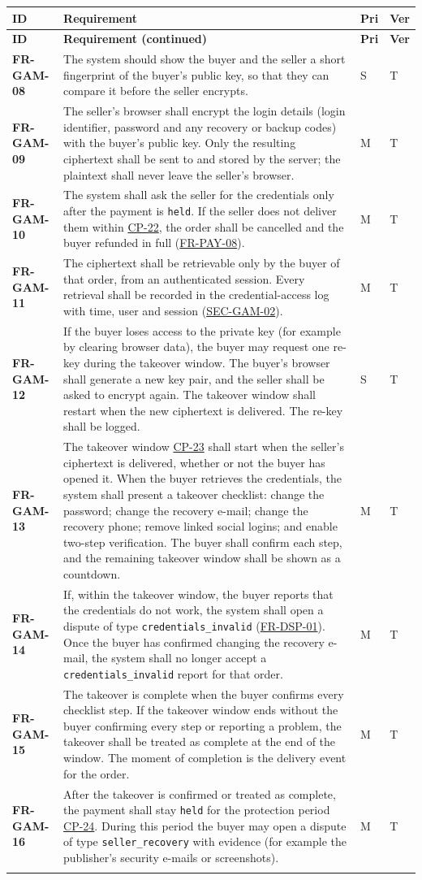 \documentclass[11pt,a4paper]{report}
\makeatletter
\newenvironment{reqs}{%
  \small
  \begin{longtable}{@{}>{\raggedright\arraybackslash}p{2.35cm}
                       >{\raggedright\arraybackslash}p{10.3cm}
                       >{\centering\arraybackslash}p{0.7cm}
                       >{\centering\arraybackslash}p{0.7cm}@{}}
  \toprule
  \textbf{ID} & \textbf{Requirement} & \textbf{Pri} & \textbf{Ver} \\
  \midrule
  \endfirsthead
  \toprule
  \textbf{ID} & \textbf{Requirement (continued)} & \textbf{Pri} & \textbf{Ver} \\
  \midrule
  \endhead
  \bottomrule
  \endfoot
}{\end{longtable}}
\newcommand{\req}[5]{\leavevmode\textbf{#1}\hypertarget{#1}{} & #5 & #2 & #3 \\ \addlinespace[2pt]}
\newcommand{\rr}[1]{\hyperlink{#1}{#1}}
\newcommand{\cp}[1]{\hyperlink{#1}{#1}}
\makeatother
\begin{document}
\begin{reqs}
\req{FR-GAM-08}{S}{T}{new}{The system should show the buyer and the seller a short fingerprint of the buyer's public key, so that they can compare it before the seller encrypts.}
\req{FR-GAM-09}{M}{T}{FR-97}{The seller's browser shall encrypt the login details (login identifier, password and any recovery or backup codes) with the buyer's public key. Only the resulting ciphertext shall be sent to and stored by the server; the plaintext shall never leave the seller's browser.}
\req{FR-GAM-10}{M}{T}{FR-98}{The system shall ask the seller for the credentials only after the payment is \texttt{held}. If the seller does not deliver them within \cp{CP-22}, the order shall be cancelled and the buyer refunded in full (\rr{FR-PAY-08}).}
\req{FR-GAM-11}{M}{T}{FR-98}{The ciphertext shall be retrievable only by the buyer of that order, from an authenticated session. Every retrieval shall be recorded in the credential-access log with time, user and session (\rr{SEC-GAM-02}).}
\req{FR-GAM-12}{S}{T}{new}{If the buyer loses access to the private key (for example by clearing browser data), the buyer may request one re-key during the takeover window. The buyer's browser shall generate a new key pair, and the seller shall be asked to encrypt again. The takeover window shall restart when the new ciphertext is delivered. The re-key shall be logged.}
\req{FR-GAM-13}{M}{T}{FR-99}{The takeover window \cp{CP-23} shall start when the seller's ciphertext is delivered, whether or not the buyer has opened it. When the buyer retrieves the credentials, the system shall present a takeover checklist: change the password; change the recovery e-mail; change the recovery phone; remove linked social logins; and enable two-step verification. The buyer shall confirm each step, and the remaining takeover window shall be shown as a countdown.}
\req{FR-GAM-14}{M}{T}{FR-100}{If, within the takeover window, the buyer reports that the credentials do not work, the system shall open a dispute of type \texttt{credentials\_invalid} (\rr{FR-DSP-01}). Once the buyer has confirmed changing the recovery e-mail, the system shall no longer accept a \texttt{credentials\_invalid} report for that order.}
\req{FR-GAM-15}{M}{T}{new}{The takeover is complete when the buyer confirms every checklist step. If the takeover window ends without the buyer confirming every step or reporting a problem, the takeover shall be treated as complete at the end of the window. The moment of completion is the delivery event for the order.}
\req{FR-GAM-16}{M}{T}{FR-101}{After the takeover is confirmed or treated as complete, the payment shall stay \texttt{held} for the protection period \cp{CP-24}. During this period the buyer may open a dispute of type \texttt{seller\_recovery} with evidence (for example the publisher's security e-mails or screenshots).}

\end{reqs}
\end{document}
